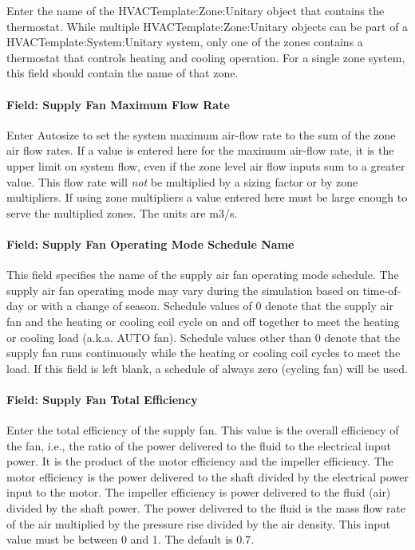 Enter the name of the HVACTemplate:Zone:Unitary object that contains the thermostat. While multiple HVACTemplate:Zone:Unitary objects can be part of a HVACTemplate:System:Unitary system, only one of the zones contains a thermostat that controls heating and cooling operation. For a single zone system, this field should contain the name of that zone.

\paragraph{Field: Supply Fan Maximum Flow Rate}\label{field-supply-fan-maximum-flow-rate}

Enter Autosize to set the system maximum air-flow rate to the sum of the zone air flow rates. If a value is entered here for the maximum air-flow rate, it is the upper limit on system flow, even if the zone level air flow inputs sum to a greater value. This flow rate will \emph{not} be multiplied by a sizing factor or by zone multipliers. If using zone multipliers a value entered here must be large enough to serve the multiplied zones. The units are m3/s.

\paragraph{Field: Supply Fan Operating Mode Schedule Name}\label{field-supply-fan-operating-mode-schedule-name-4}

This field specifies the name of the supply air fan operating mode schedule. The supply air fan operating mode may vary during the simulation based on time-of-day or with a change of season. Schedule values of 0 denote that the supply air fan and the heating or cooling coil cycle on and off together to meet the heating or cooling load (a.k.a. AUTO fan). Schedule values other than 0 denote that the supply fan runs continuously while the heating or cooling coil cycles to meet the load. If this field is left blank, a schedule of always zero (cycling fan) will be used.

\paragraph{Field: Supply Fan Total Efficiency}\label{field-supply-fan-total-efficiency-5}

Enter the total efficiency of the supply fan. This value is the overall efficiency of the fan, i.e., the ratio of the power delivered to the fluid to the electrical input power. It is the product of the motor efficiency and the impeller efficiency. The motor efficiency is the power delivered to the shaft divided by the electrical power input to the motor. The impeller efficiency is power delivered to the fluid (air) divided by the shaft power. The power delivered to the fluid is the mass flow rate of the air multiplied by the pressure rise divided by the air density. This input value must be between 0 and 1. The default is 0.7.

